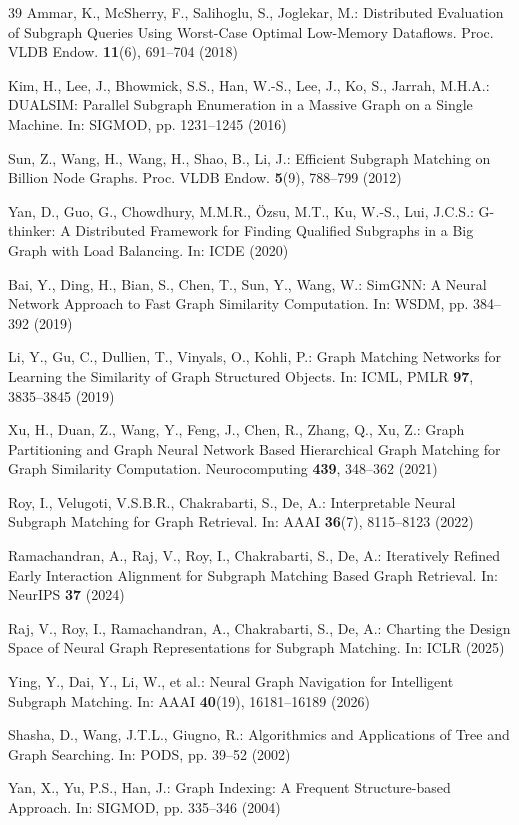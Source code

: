 \documentclass[runningheads]{llncs}
\begin{document}
\begin{thebibliography}{39}
Ammar, K., McSherry, F., Salihoglu, S., Joglekar, M.: Distributed Evaluation of Subgraph Queries Using Worst-Case Optimal Low-Memory Dataflows. Proc. VLDB Endow. \textbf{11}(6), 691--704 (2018)

Kim, H., Lee, J., Bhowmick, S.S., Han, W.-S., Lee, J., Ko, S., Jarrah, M.H.A.: DUALSIM: Parallel Subgraph Enumeration in a Massive Graph on a Single Machine. In: SIGMOD, pp. 1231--1245 (2016)

Sun, Z., Wang, H., Wang, H., Shao, B., Li, J.: Efficient Subgraph Matching on Billion Node Graphs. Proc. VLDB Endow. \textbf{5}(9), 788--799 (2012)

Yan, D., Guo, G., Chowdhury, M.M.R., \"{O}zsu, M.T., Ku, W.-S., Lui, J.C.S.: G-thinker: A Distributed Framework for Finding Qualified Subgraphs in a Big Graph with Load Balancing. In: ICDE (2020)

Bai, Y., Ding, H., Bian, S., Chen, T., Sun, Y., Wang, W.: SimGNN: A Neural Network Approach to Fast Graph Similarity Computation. In: WSDM, pp. 384--392 (2019)

Li, Y., Gu, C., Dullien, T., Vinyals, O., Kohli, P.: Graph Matching Networks for Learning the Similarity of Graph Structured Objects. In: ICML, PMLR \textbf{97}, 3835--3845 (2019)

Xu, H., Duan, Z., Wang, Y., Feng, J., Chen, R., Zhang, Q., Xu, Z.: Graph Partitioning and Graph Neural Network Based Hierarchical Graph Matching for Graph Similarity Computation. Neurocomputing \textbf{439}, 348--362 (2021)

Roy, I., Velugoti, V.S.B.R., Chakrabarti, S., De, A.: Interpretable Neural Subgraph Matching for Graph Retrieval. In: AAAI \textbf{36}(7), 8115--8123 (2022)

Ramachandran, A., Raj, V., Roy, I., Chakrabarti, S., De, A.: Iteratively Refined Early Interaction Alignment for Subgraph Matching Based Graph Retrieval. In: NeurIPS \textbf{37} (2024)

Raj, V., Roy, I., Ramachandran, A., Chakrabarti, S., De, A.: Charting the Design Space of Neural Graph Representations for Subgraph Matching. In: ICLR (2025)

Ying, Y., Dai, Y., Li, W., et al.: Neural Graph Navigation for Intelligent Subgraph Matching. In: AAAI \textbf{40}(19), 16181--16189 (2026)

Shasha, D., Wang, J.T.L., Giugno, R.: Algorithmics and Applications of Tree and Graph Searching. In: PODS, pp. 39--52 (2002)

\enlargethispage{4\baselineskip}
Yan, X., Yu, P.S., Han, J.: Graph Indexing: A Frequent Structure-based Approach. In: SIGMOD, pp. 335--346 (2004)

\end{thebibliography}
\end{document}
